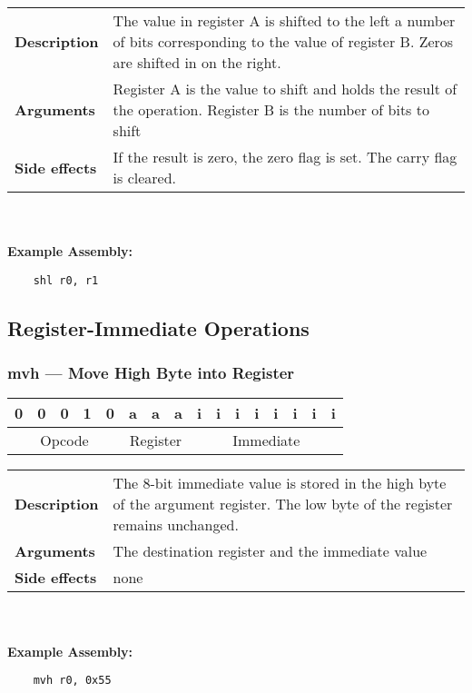 \documentclass[titlepage]{article}
\begin{document}
\begin{tabular}{l p{8cm}}
{\bf Description} & The value in register A is shifted to the left a number of bits corresponding to the value of register B. Zeros are shifted in on the right. \\
{\bf Arguments} & Register A is the value to shift and holds the result of the operation. Register B is the number of bits to shift \\
{\bf Side effects} & If the result is zero, the zero flag is set. The carry flag is cleared. \\
\end{tabular}\\ \\
{\bf Example Assembly:}
\begin{verbatim}
    shl r0, r1
\end{verbatim}

\subsection{Register-Immediate Operations}

\subsubsection{mvh --- Move High Byte into Register}\begin{center}
\begin{tabular}{|c|c|c|c|c|c|c|c|c|c|c|c|c|c|c|c|}
\hline
0 & 0 & 0 & 1 & 0 & a & a & a & i & i & i & i & i & i & i & i \\
\hline
\multicolumn{5}{|c}{Opcode} &
\multicolumn{3}{|c}{Register} &
\multicolumn{8}{|c|}{Immediate} \\
\hline
\end{tabular}
\end{center}

\begin{tabular}{l p{8cm}}
{\bf Description} & The 8-bit immediate value is stored in the high byte of the argument register. The low byte of the register remains unchanged. \\
{\bf Arguments} & The destination register and the immediate value \\
{\bf Side effects} & none \\
\end{tabular}\\ \\
{\bf Example Assembly:}
\begin{verbatim}
    mvh r0, 0x55
\end{verbatim}
\end{document}
